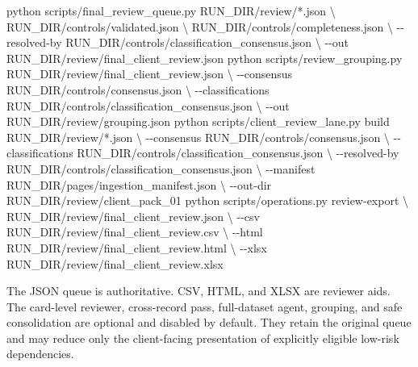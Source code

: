 \documentclass[
]{article}
\newenvironment{Shaded}{}{}
\newcommand{\AttributeTok}[1]{\textcolor[rgb]{0.49,0.56,0.16}{#1}}
\newcommand{\DataTypeTok}[1]{\textcolor[rgb]{0.56,0.13,0.00}{#1}}
\newcommand{\ExtensionTok}[1]{#1}
\newcommand{\NormalTok}[1]{#1}
\newcommand{\PreprocessorTok}[1]{\textcolor[rgb]{0.74,0.48,0.00}{#1}}
\begin{document}
\begin{Shaded}
\begin{Highlighting}[]
\ExtensionTok{python}\NormalTok{ scripts/final\_review\_queue.py RUN\_DIR/review/}\PreprocessorTok{*}\NormalTok{.json }\DataTypeTok{\textbackslash{}}
\NormalTok{  RUN\_DIR/controls/validated.json }\DataTypeTok{\textbackslash{}}
\NormalTok{  RUN\_DIR/controls/completeness.json }\DataTypeTok{\textbackslash{}}
  \AttributeTok{{-}{-}resolved{-}by}\NormalTok{ RUN\_DIR/controls/classification\_consensus.json }\DataTypeTok{\textbackslash{}}
  \AttributeTok{{-}{-}out}\NormalTok{ RUN\_DIR/review/final\_client\_review.json}
\ExtensionTok{python}\NormalTok{ scripts/review\_grouping.py RUN\_DIR/review/final\_client\_review.json }\DataTypeTok{\textbackslash{}}
  \AttributeTok{{-}{-}consensus}\NormalTok{ RUN\_DIR/controls/consensus.json }\DataTypeTok{\textbackslash{}}
  \AttributeTok{{-}{-}classifications}\NormalTok{ RUN\_DIR/controls/classification\_consensus.json }\DataTypeTok{\textbackslash{}}
  \AttributeTok{{-}{-}out}\NormalTok{ RUN\_DIR/review/grouping.json}
\ExtensionTok{python}\NormalTok{ scripts/client\_review\_lane.py build RUN\_DIR/review/}\PreprocessorTok{*}\NormalTok{.json }\DataTypeTok{\textbackslash{}}
  \AttributeTok{{-}{-}consensus}\NormalTok{ RUN\_DIR/controls/consensus.json }\DataTypeTok{\textbackslash{}}
  \AttributeTok{{-}{-}classifications}\NormalTok{ RUN\_DIR/controls/classification\_consensus.json }\DataTypeTok{\textbackslash{}}
  \AttributeTok{{-}{-}resolved{-}by}\NormalTok{ RUN\_DIR/controls/classification\_consensus.json }\DataTypeTok{\textbackslash{}}
  \AttributeTok{{-}{-}manifest}\NormalTok{ RUN\_DIR/pages/ingestion\_manifest.json }\DataTypeTok{\textbackslash{}}
  \AttributeTok{{-}{-}out{-}dir}\NormalTok{ RUN\_DIR/review/client\_pack\_01}
\ExtensionTok{python}\NormalTok{ scripts/operations.py review{-}export }\DataTypeTok{\textbackslash{}}
\NormalTok{  RUN\_DIR/review/final\_client\_review.json }\DataTypeTok{\textbackslash{}}
  \AttributeTok{{-}{-}csv}\NormalTok{ RUN\_DIR/review/final\_client\_review.csv }\DataTypeTok{\textbackslash{}}
  \AttributeTok{{-}{-}html}\NormalTok{ RUN\_DIR/review/final\_client\_review.html }\DataTypeTok{\textbackslash{}}
  \AttributeTok{{-}{-}xlsx}\NormalTok{ RUN\_DIR/review/final\_client\_review.xlsx}
\end{Highlighting}
\end{Shaded}

The JSON queue is authoritative. CSV, HTML, and XLSX are reviewer aids.
The card-level reviewer, cross-record pass, full-dataset agent,
grouping, and safe consolidation are optional and disabled by default.
They retain the original queue and may reduce only the client-facing
presentation of explicitly eligible low-risk dependencies.
\end{document}
